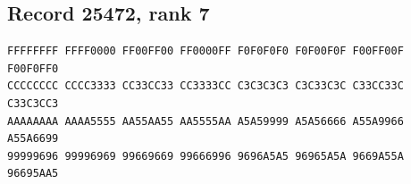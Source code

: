 \documentclass[11pt]{amsart}
\theoremstyle{definition}
\theoremstyle{remark}
\numberwithin{equation}{section}
\numberwithin{table}{section}
\begin{document}
\subsection*{Record 25472, rank 7}
\begin{Verbatim}[fontsize=\scriptsize,xleftmargin=1em]
FFFFFFFF FFFF0000 FF00FF00 FF0000FF F0F0F0F0 F0F00F0F F00FF00F F00F0FF0
CCCCCCCC CCCC3333 CC33CC33 CC3333CC C3C3C3C3 C3C33C3C C33CC33C C33C3CC3
AAAAAAAA AAAA5555 AA55AA55 AA5555AA A5A59999 A5A56666 A55A9966 A55A6699
99999696 99996969 99669669 99666996 9696A5A5 96965A5A 9669A55A 96695AA5
\end{Verbatim}
\par
{}\par
\end{document}
